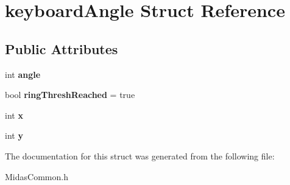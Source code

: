 \hypertarget{structkeyboard_angle}{\section{keyboard\+Angle Struct Reference}
\label{structkeyboard_angle}
}
\subsection*{Public Attributes}
\begin{DoxyCompactItemize}
\item 
\hypertarget{structkeyboard_angle_ace923da357c8b7cef7a67bc31c708059}{int {\bfseries angle}}\label{structkeyboard_angle_ace923da357c8b7cef7a67bc31c708059}

\item 
\hypertarget{structkeyboard_angle_a89224091f1de2b8f671a8f6f76e7db9b}{bool {\bfseries ring\+Thresh\+Reached} = true}\label{structkeyboard_angle_a89224091f1de2b8f671a8f6f76e7db9b}

\item 
\hypertarget{structkeyboard_angle_aa66cee81a254b859e4a5b14359b11d4b}{int {\bfseries x}}\label{structkeyboard_angle_aa66cee81a254b859e4a5b14359b11d4b}

\item 
\hypertarget{structkeyboard_angle_a48946050b4e8cea89b537374a0d6f357}{int {\bfseries y}}\label{structkeyboard_angle_a48946050b4e8cea89b537374a0d6f357}

\end{DoxyCompactItemize}


The documentation for this struct was generated from the following file\+:\begin{DoxyCompactItemize}
\item 
Midas\+Common.\+h\end{DoxyCompactItemize}
